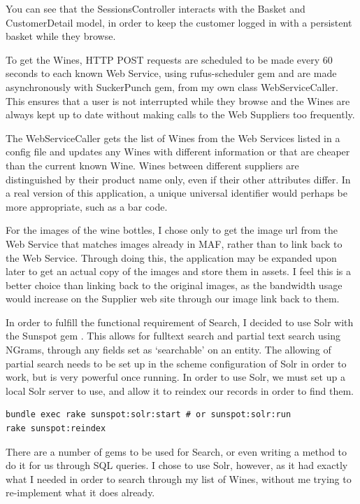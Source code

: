 \documentclass[12pt]{article}
\begin{document}
You can see that the SessionsController interacts with the Basket and CustomerDetail model, in order to keep the customer logged in with a persistent basket while they browse.

To get the Wines, HTTP POST requests are scheduled to be made every 60 seconds to each known Web Service, using rufus-scheduler gem\cite{rufus} and are made asynchronously with SuckerPunch gem\cite{suckerpunch}, from my own class WebServiceCaller. This ensures that a user is not interrupted while they browse and the Wines are always kept up to date without making calls to the Web Suppliers too frequently. 

The WebServiceCaller gets the list of Wines from the Web Services listed in a config file and updates any Wines with different information or that are cheaper than the current known Wine. Wines between different suppliers are distinguished by their product name only, even if their other attributes differ. In a real version of this application, a unique universal identifier would perhaps be more appropriate, such as a bar code.

For the images of the wine bottles, I chose only to get the image url from the Web Service that matches images already in MAF, rather than to link back to the Web Service. Through doing this, the application may be expanded upon later to get an actual copy of the images and store them in assets. I feel this is a better choice than linking back to the original images, as the bandwidth usage would increase on the Supplier web site through our image link back to them.

In order to fulfill the functional requirement of Search, I decided to use Solr with the Sunspot gem \cite{solrsunspot}. This allows for fulltext search and partial text search using NGrams, through any fields set as `searchable' on an entity. The allowing of partial search needs to be set up in the scheme configuration of Solr in order to work, but is very powerful once running. In order to use Solr, we must set up a local Solr server to use, and allow it to reindex our records in order to find them.
\begin{lstlisting}
bundle exec rake sunspot:solr:start # or sunspot:solr:run
rake sunspot:reindex
\end{lstlisting}
There are a number of gems to be used for Search, or even writing a method to do it for us through SQL queries. I chose to use Solr, however, as it had exactly what I needed in order to search through my list of Wines, without me trying to re-implement what it does already.
\end{document}
